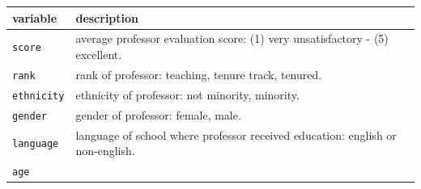 \documentclass[]{article}
\begin{document}
\begin{longtable}[]{@{}ll@{}}
\toprule
\begin{minipage}[b]{0.22\columnwidth}\raggedright\strut
variable\strut
\end{minipage} & \begin{minipage}[b]{0.16\columnwidth}\raggedright\strut
description\strut
\end{minipage}\tabularnewline
\midrule
\endhead
\begin{minipage}[t]{0.22\columnwidth}\raggedright\strut
\texttt{score}\strut
\end{minipage} & \begin{minipage}[t]{0.16\columnwidth}\raggedright\strut
average professor evaluation score: (1) very unsatisfactory - (5)
excellent.\strut
\end{minipage}\tabularnewline
\begin{minipage}[t]{0.22\columnwidth}\raggedright\strut
\texttt{rank}\strut
\end{minipage} & \begin{minipage}[t]{0.16\columnwidth}\raggedright\strut
rank of professor: teaching, tenure track, tenured.\strut
\end{minipage}\tabularnewline
\begin{minipage}[t]{0.22\columnwidth}\raggedright\strut
\texttt{ethnicity}\strut
\end{minipage} & \begin{minipage}[t]{0.16\columnwidth}\raggedright\strut
ethnicity of professor: not minority, minority.\strut
\end{minipage}\tabularnewline
\begin{minipage}[t]{0.22\columnwidth}\raggedright\strut
\texttt{gender}\strut
\end{minipage} & \begin{minipage}[t]{0.16\columnwidth}\raggedright\strut
gender of professor: female, male.\strut
\end{minipage}\tabularnewline
\begin{minipage}[t]{0.22\columnwidth}\raggedright\strut
\texttt{language}\strut
\end{minipage} & \begin{minipage}[t]{0.16\columnwidth}\raggedright\strut
language of school where professor received education: english or
non-english.\strut
\end{minipage}\tabularnewline
\begin{minipage}[t]{0.22\columnwidth}\raggedright\strut
\texttt{age}\strut
\end{minipage} & \begin{minipage}[t]{0.16\columnwidth}\raggedright\strut

\end{minipage}
\end{longtable}
\end{document}
